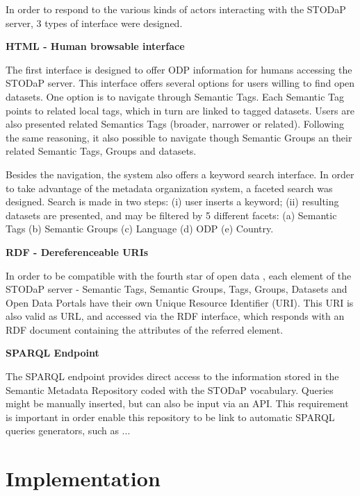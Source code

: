 In order to respond to the various kinds of actors interacting with the STODaP server, 3 types of interface were designed.

\noindent\textbf{HTML - Human browsable interface}

The first interface is designed to offer ODP information for humans accessing the STODaP server.
This interface offers several options for users willing to find open datasets.
One option is to navigate through Semantic Tags.
Each Semantic Tag points to related local tags, which in turn are linked to tagged datasets.
Users are also presented related Semantics Tags (broader, narrower or related).
Following the same reasoning, it also possible to navigate though Semantic Groups an their related Semantic Tags, Groups and datasets.

Besides the navigation, the system also offers a keyword search interface.
In order to take advantage of the metadata organization system, a faceted search was designed.
Search is made in two steps: (i) user inserts a keyword; (ii) resulting datasets are presented, and may be filtered by 5 different facets: (a) Semantic Tags (b) Semantic Groups (c) Language (d) ODP (e) Country. 

\noindent\textbf{RDF - Dereferenceable URIs}

In order to be compatible with the fourth star of open data \cite{Berners-Lee2010}, each element of the STODaP server - Semantic Tags, Semantic Groups, Tags, Groups, Datasets and Open Data Portals have their own Unique Resource Identifier (URI).
This URI is also valid as URL, and accessed via the RDF interface, which responds with an RDF document containing the attributes of the referred element.

\noindent\textbf{SPARQL Endpoint}

The SPARQL endpoint provides direct access to the information stored in the Semantic Metadata Repository coded with the STODaP vocabulary.
Queries might be manually inserted, but can also be input via an API.
This requirement is important in order enable this repository to be link to automatic SPARQL queries generators, such as ...

\section{Implementation}
\label{sec:implementation}

